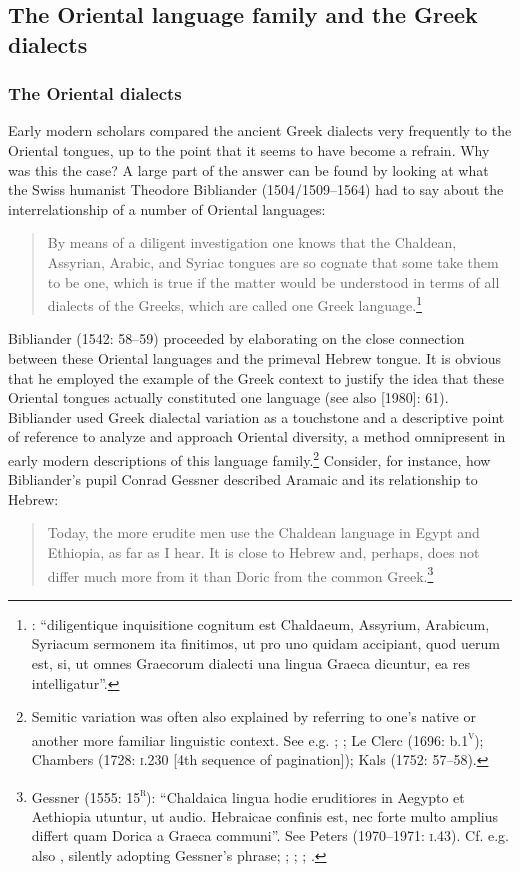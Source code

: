 \documentclass[output=paper]{langsci/langscibook}
\begin{document}
\subsection{The Oriental language family and the Greek dialects}
\hypertarget{Toc19704864}{}\subsubsection{The Oriental dialects}
\hypertarget{Toc19704865}{}
Early modern scholars compared the ancient Greek dialects very frequently to the Oriental tongues, up to the point that it seems to have become a refrain. Why was this the case? A large part of the answer can be found by looking at what the Swiss humanist Theodore Bibliander (1504/1509–1564) had to say about the interrelationship of a number of Oriental languages:

\begin{quote}
By means of a diligent investigation one knows that the Chaldean, Assyrian, Arabic, and Syriac tongues are so cognate that some take them to be one, which is true if the matter would be understood in terms of all dialects of the Greeks, which are called one Greek language.\footnote{\citet[58]{Bibliander1542}: “diligentique inquisitione cognitum est Chaldaeum, Assyrium, Arabicum, Syriacum sermonem ita finitimos, ut pro uno quidam accipiant, quod uerum est, si, ut omnes Graecorum dialecti una lingua Graeca dicuntur, ea res intelligatur”.}
\end{quote}

Bibliander (1542: 58–59) proceeded by elaborating on the close connection between these Oriental languages and the primeval Hebrew tongue. It is obvious that he employed the example of the Greek context to justify the idea that these Oriental tongues actually constituted one language (see also \citealt{Metcalf2013} [1980]: 61). Bibliander used Greek dialectal variation as a touchstone and a descriptive point of reference to analyze and approach Oriental diversity, a method omnipresent in early modern descriptions of this language family.\footnote{Semitic variation was often also explained by referring to one’s native or another more familiar linguistic context. See e.g. \citet[41]{Purchas1613}; \citet[197]{Kircher1679}; Le Clerc (1696: b.1\textsc{\textsuperscript{v}}); Chambers (1728: \textsc{i.}230 [4th sequence of pagination]); Kals (1752: 57–58).} Consider, for instance, how Bibliander’s pupil Conrad Gessner described Aramaic and its relationship to Hebrew:

\begin{quote}
Today, the more erudite men use the Chaldean language in Egypt and Ethiopia, as far as I hear. It is close to Hebrew and, perhaps, does not differ much more from it than Doric from the common Greek.\footnote{Gessner (1555: 15\textsc{\textsuperscript{r}}): “Chaldaica lingua hodie eruditiores in Aegypto et Aethiopia utuntur, ut audio. Hebraicae confinis est, nec forte multo amplius differt quam Dorica a Graeca communi”. See Peters (1970–1971: \textsc{i.}43). Cf. e.g. also \citet[325]{Rocca1591}, silently adopting Gessner’s phrase; \citet[459]{Saumaise1643a}; \citet[88]{Bagnati1732}; \citet[24]{Wesley1736}; \citet[22]{Eichhorn1780}.}
\end{quote}
\end{document}
